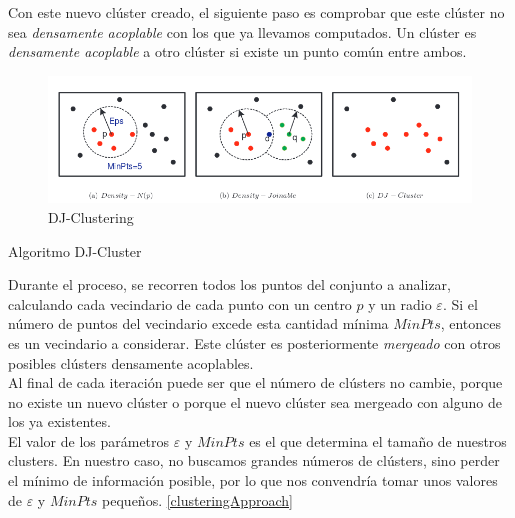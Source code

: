 \documentclass[a4paper, 12pt]{article}
\begin{document}
Con este nuevo cl\'uster creado, el siguiente paso es comprobar que este cl\'uster no sea \textit{densamente acoplable} con los que ya llevamos computados. Un cl\'uster es \textit{densamente acoplable} a otro cl\'uster si existe un punto com\'un entre ambos. \\

\begin{figure}[H]
\centering
	\includegraphics[scale=.7]{djcluster.png}
\caption{DJ-Clustering}
\end{figure}

\begin{algorithm}[!htbp]\label{djCluster}
\begin{algorithmic}[1]
		\Else
		\EndIf
	\EndFor
\end{algorithmic}
\caption{\label{alg:djcluster} Algoritmo DJ-Cluster}
\end{algorithm}

Durante el proceso, se recorren todos los puntos del conjunto a analizar, calculando cada vecindario de cada punto con un centro $p$ y un radio $\varepsilon$. Si el n\'umero de puntos del vecindario excede esta cantidad m\'inima $MinPts$, entonces es un vecindario a considerar. Este cl\'uster es posteriormente \textit{mergeado} con otros posibles cl\'usters densamente acoplables. \\

Al final de cada iteraci\'on puede ser que el n\'umero de cl\'usters no cambie, porque no existe un nuevo cl\'uster o porque el nuevo cl\'uster sea mergeado con alguno de los ya existentes.\\


El valor de los par\'ametros $\varepsilon$ y $MinPts$ es el que determina el tama\~no de nuestros clusters. En nuestro caso, no buscamos grandes n\'umeros de cl\'usters, sino perder el m\'inimo de informaci\'on posible, por lo que nos convendr\'ia tomar unos valores de $\varepsilon$ y $MinPts$ peque\~nos. \ref{clusteringApproach}
\end{document}
